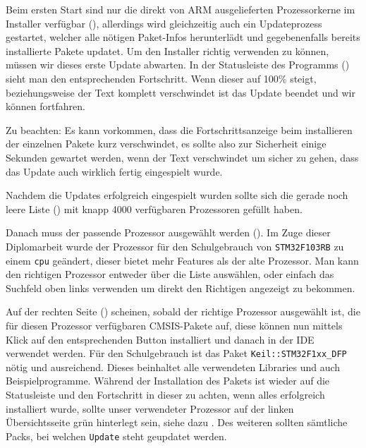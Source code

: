 
Beim ersten Start sind nur die direkt von \gls{ARM} ausgelieferten Prozessorkerne im Installer verfügbar (), allerdings wird gleichzeitig auch ein Updateprozess gestartet, welcher alle nötigen Paket-Infos herunterlädt und gegebenenfalls bereits installierte Pakete updatet. Um den Installer richtig verwenden zu können, müssen wir dieses erste Update abwarten. In der Statusleiste des Programms () sieht man den entsprechenden Fortschritt. Wenn dieser auf 100\% steigt, beziehungsweise der Text komplett verschwindet ist das Update beendet und wir können fortfahren.

\begin{warning}
  Zu beachten: Es kann vorkommen, dass die Fortschrittsanzeige beim installieren der einzelnen Pakete kurz verschwindet, es sollte also zur Sicherheit einige Sekunden gewartet werden, wenn der Text verschwindet um sicher zu gehen, dass das Update auch wirklich fertig eingespielt wurde.
\end{warning}


Nachdem die Updates erfolgreich eingespielt wurden sollte sich die gerade noch leere Liste () mit knapp 4000 verfügbaren Prozessoren gefüllt haben.


Danach muss der passende Prozessor ausgewählt werden (). Im Zuge dieser Diplomarbeit wurde der Prozessor für den Schulgebrauch von \texttt{STM32F103RB} zu einem \texttt{\gls{cpu}} geändert, dieser bietet mehr Features als der alte Prozessor. Man kann den richtigen Prozessor entweder über die Liste auswählen, oder einfach das Suchfeld oben links verwenden um direkt den Richtigen angezeigt zu bekommen.


Auf der rechten Seite () scheinen, sobald der richtige Prozessor ausgewählt ist, die für diesen Prozessor verfügbaren \gls{CMSIS}-Pakete auf, diese können nun mittels Klick auf den entsprechenden Button installiert und danach in der \gls{IDE} verwendet werden. Für den Schulgebrauch ist das Paket \texttt{\gls{Keil}::STM32F1xx\_DFP} nötig und ausreichend. Dieses beinhaltet alle verwendeten Libraries und auch Beispielprogramme. Während der Installation des Pakets ist wieder auf die Statusleiste und den Fortschritt in dieser zu achten, wenn alles erfolgreich installiert wurde, sollte unser verwendeter Prozessor auf der linken Übersichtsseite grün hinterlegt sein, siehe dazu . Des weiteren sollten sämtliche Packs, bei welchen \texttt{Update} steht geupdatet werden.

